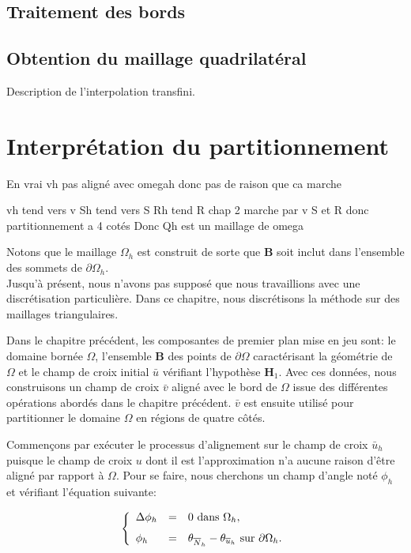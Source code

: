 \subsection*{Traitement des bords}

\subsection*{Obtention du maillage quadrilatéral}
Description de l'interpolation transfini.

\section*{Interprétation du partitionnement}
En vrai vh pas aligné avec omegah donc pas de raison que ca marche

vh tend vers v
Sh tend vers S
Rh tend R
chap 2 marche par v S et R donc partitionnement a 4 cotés
Donc Qh est un maillage de omega



Notons que le maillage $\Omega_h$ est construit de sorte que $\mathbf{B}$ soit inclut dans l'ensemble des sommets de $\partial\Omega_h$.\\

Jusqu'à présent, nous n'avons pas supposé que nous travaillions avec une discrétisation particulière. Dans ce chapitre, nous discrétisons la méthode sur des maillages triangulaires.

Dans le chapitre précédent, les composantes de premier plan mise en jeu sont: le domaine bornée $\Omega$, l'ensemble $\mathbf{B}$ des points de $\partial\Omega$ caractérisant la géométrie de $\Omega$ et le champ de croix initial $\bar{u}$ vérifiant l'hypothèse $\mathbf{H}_1$. Avec ces données, nous construisons un champ de croix $\bar{v}$ aligné avec le bord de $\Omega$ issue des différentes opérations abordés dans le chapitre précédent. $\bar{v}$ est ensuite utilisé pour partitionner le domaine $\Omega$ en régions de quatre côtés.

Commençons par exécuter le processus d'alignement sur le champ de croix $\bar{u}_h$ puisque le champ de croix $u$ dont il est l'approximation n'a aucune raison d'être aligné par rapport à $\Omega$. Pour se faire, nous cherchons un champ d'angle noté $\phi_h$ et vérifiant l'équation suivante:

\begin{equation}
\left\{
\begin{array}{lcl}
\Delta\phi_h &=& 0 \mbox{ dans }\Omega_h,\\[0.25cm]
\phi_h &=& \theta_{\Bar{N}_h}-\theta_{\bar{u}_h} \mbox{ sur } \partial\Omega_h.
\end{array}
\right.
\label{eq:phi_computation_omega_h}
\end{equation}

